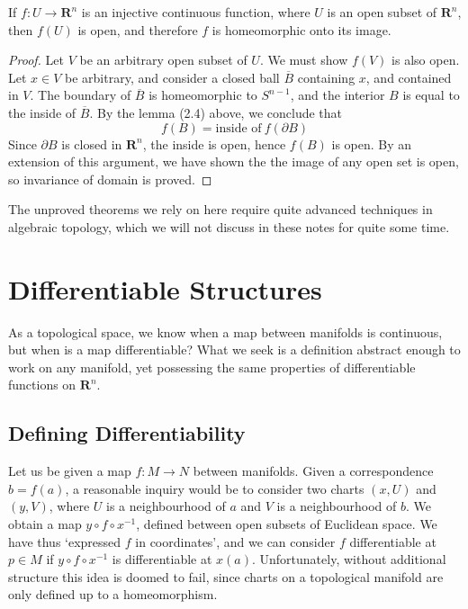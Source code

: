 \begin{theorem}
    If $f:U \to \mathbf{R}^n$ is an injective continuous function, where $U$ is an open subset of $\mathbf{R}^n$, then $f(U)$ is open, and therefore $f$ is homeomorphic onto its image.
\end{theorem}
\begin{proof}
    Let $V$ be an arbitrary open subset of $U$. We must show $f(V)$ is also open. Let $x \in V$ be arbitrary, and consider a closed ball $\overline{B}$ containing $x$, and contained in $V$. The boundary of $\overline{B}$ is homeomorphic to $S^{n-1}$, and the interior $B$ is equal to the inside of $\overline{B}$. By the lemma (2.4) above, we conclude that
    \[ f(B) = \text{inside of}\ f(\partial B) \]
    Since $\partial B$ is closed in $\mathbf{R}^n$, the inside is open, hence $f(B)$ is open. By an extension of this argument, we have shown the the image of any open set is open, so invariance of domain is proved.
\end{proof}

The unproved theorems we rely on here require quite advanced techniques in algebraic topology, which we will not discuss in these notes for quite some time.








\chapter{Differentiable Structures}

As a topological space, we know when a map between manifolds is continuous, but when is a map differentiable? What we seek is a definition abstract enough to work on any manifold, yet possessing the same properties of differentiable functions on $\mathbf{R}^n$.

\section{Defining Differentiability}

Let us be given a map $f:M \to N$ between manifolds. Given a correspondence $b = f(a)$, a reasonable inquiry would be to consider two charts $(x,U)$ and $(y,V)$, where $U$ is a neighbourhood of $a$ and $V$ is a neighbourhood of $b$. We obtain a map $y \circ f \circ x^{-1}$, defined between open subsets of Euclidean space. We have thus `expressed $f$ in coordinates', and we can consider $f$ differentiable at $p \in M$ if $y \circ f \circ x^{-1}$ is differentiable at $x(a)$. Unfortunately, without additional structure this idea is doomed to fail, since charts on a topological manifold are only defined up to a homeomorphism.

